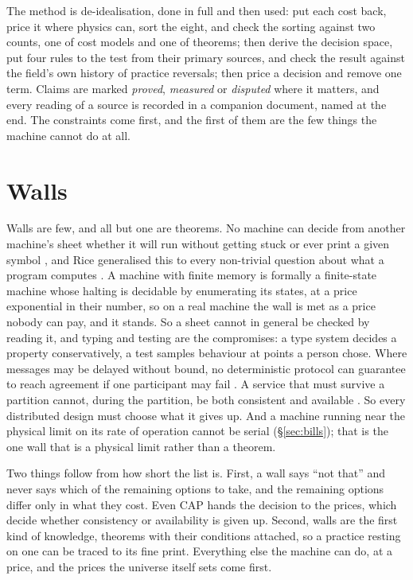 \documentclass[11pt,oneside]{article}
\theoremstyle{definition}
\theoremstyle{remark}
\begin{document}
The method is de-idealisation, done in full and then used: put each cost back, price it
where physics can, sort the eight, and check the sorting against two counts, one of cost
models and one of theorems; then derive the decision space, put four rules to the test
from their primary sources, and check the result against the field's own history of
practice reversals; then price a decision and remove one term. Claims are marked
\emph{proved}, \emph{measured} or \emph{disputed} where it matters, and every reading of a
source is recorded in a companion document, named at the end. The constraints come first,
and the first of them are the few things the machine cannot do at all.

\section{Walls}\label{sec:cannot}
Walls are few, and all but one are theorems. No machine can decide from another machine's
sheet whether it will run without getting stuck or ever print a given symbol
\cite{turing1936}, and Rice generalised this to every non-trivial question about what a
program computes \cite{rice1953}. A machine with finite memory is formally a finite-state
machine whose halting is decidable by enumerating its states, at a price exponential in
their number, so on a real machine the wall is met as a price nobody can pay, and it
stands. So a sheet cannot in general be checked by reading it, and typing and testing are
the compromises: a type system decides a property conservatively, a test samples
behaviour at points a person chose. Where messages may be delayed without bound, no
deterministic protocol can guarantee to reach agreement if one participant may fail
\cite{flp1985}. A service that must survive a partition cannot, during the partition, be
both consistent and available \cite{gilbertlynch2002}. So every distributed design must
choose what it gives up. And a machine running near the physical limit on its rate of
operation cannot be serial (\S\ref{sec:bills}); that is the one wall that is a physical
limit rather than a theorem.

Two things follow from how short the list is. First, a wall says ``not that'' and never
says which of the remaining options to take, and the remaining options differ only in what
they cost. Even CAP hands the decision to the prices, which decide whether consistency or
availability is given up. Second, walls are the first kind of knowledge, theorems with
their conditions attached, so a practice resting on one can be traced to its fine print.
Everything else the machine can do, at a price, and the prices the universe itself sets
come first.
\end{document}
